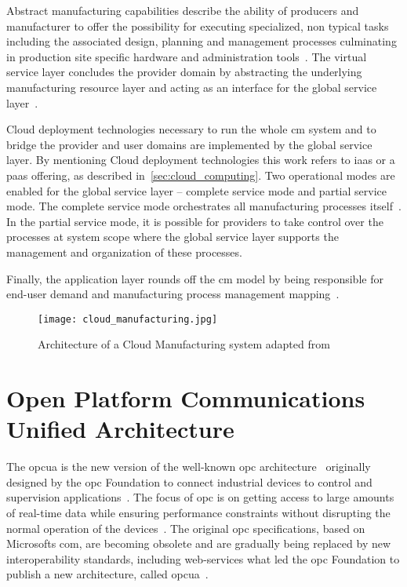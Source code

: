 \documentclass[
a4paper,
twoside,
headsepline,
cleardoublepage=empty,
parskip=half,
draft=false
]{scrbook}
\begin{document}
			Abstract manufacturing capabilities describe the ability of producers and manufacturer to offer the possibility for executing specialized, non typical tasks including the associated design, planning and management processes culminating in production site specific hardware and administration tools~\cite{he2015state}.
			The virtual service layer concludes the provider domain by abstracting the underlying manufacturing resource layer and acting as an interface for the global service layer~\cite{xu2012cloud}.
			
			Cloud deployment technologies necessary to run the whole \gls{cm} system and to bridge the provider and user domains are implemented by the global service layer.
			By mentioning Cloud deployment technologies this work refers to \gls{iaas} or a \gls{paas} offering, as described in~\cref{sec:cloud_computing}.
			Two operational modes are enabled for the global service layer -- complete service mode and partial service mode.
			The complete service mode orchestrates all manufacturing processes itself~\cite{xu2012cloud}.
			In the partial service mode, it is possible for providers to take control over the processes at system scope where the global service layer supports the management and organization of these processes.
			
			Finally, the application layer rounds off the \gls{cm} model by being responsible for end-user demand and manufacturing process management mapping~\cite{xu2012cloud}.
			
			\begin{figure}[H]
				\centering
				\texttt{[image: cloud\_manufacturing.jpg]}
				\caption{Architecture of a Cloud Manufacturing system adapted from~\cite{xu2012cloud}}
				\label{fig:cloud_manufacturing}
			\end{figure}

		\section{Open Platform Communications Unified Architecture} \label{sec:opc_ua}

			The \gls{opcua} is the new version of the well-known \gls{opc} architecture~\cite{hadlich2006providing} originally designed by the \gls{opc} Foundation to connect industrial devices to control and supervision applications~\cite{henssen2014online}. 
			The focus of \gls{opc} is on getting access to large amounts of real-time data while ensuring performance constraints without disrupting the normal operation of the devices~\cite{candido2010soa}.
			The original \gls{opc} specifications, based on Microsofts \gls{com}, are becoming obsolete and are gradually being replaced by new interoperability standards, including web-services what led the \gls{opc} Foundation to publish a new architecture, called \gls{opcua}~\cite{hadlich2006providing}.
			
\end{document}
